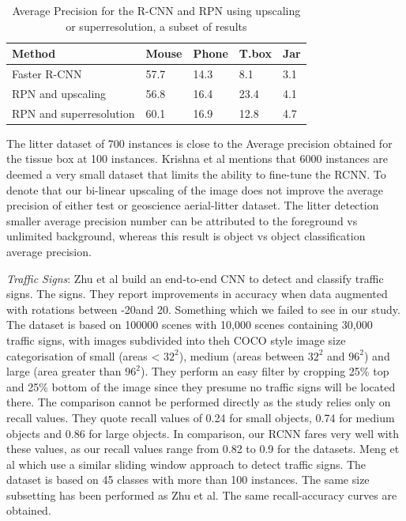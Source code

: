 \documentclass{IEEEtran}
\begin{document}
\begin{table}[h]
\caption{Average Precision for the R-CNN and RPN using upscaling or superresolution, a subset of results}
\centering
\begin{tabular}{lllll}
\hline
\textbf{Method}                         & \textbf{Mouse}            & \textbf{Phone}            & \textbf{T.box}            & \textbf{Jar}             \\ \hline
\multicolumn{1}{|l|}{Faster R-CNN}      & \multicolumn{1}{l|}{57.7} & \multicolumn{1}{l|}{14.3} & \multicolumn{1}{l|}{8.1}  & \multicolumn{1}{l|}{3.1} \\ \hline
\multicolumn{1}{|l|}{RPN and upscaling} & \multicolumn{1}{l|}{56.8} & \multicolumn{1}{l|}{16.4} & \multicolumn{1}{l|}{23.4} & \multicolumn{1}{l|}{4.1} \\ \hline
RPN and superresolution                 & 60.1                      & 16.9                      & 12.8                      & 4.7                      \\ \hline
\end{tabular}
\end{table}

The litter dataset of 700 instances is close to the Average precision obtained for the tissue box at 100 instances. Krishna et al \cite{Krishna} mentions that 6000 instances are deemed a very small dataset that limits the ability to fine-tune the RCNN. To denote that our bi-linear upscaling of the image does not improve the average precision of either test or geoscience aerial-litter dataset. The litter detection smaller average precision number can be attributed to the foreground vs unlimited background, whereas this result is object vs object classification average precision.\newline

\textit{Traffic Signs}: Zhu et al \cite{Zhu2016} build an end-to-end CNN to detect and classify traffic signs. The signs. They report improvements in accuracy when data augmented with rotations between -20\degree and 20\degree. Something which we failed to see in our study. The dataset is based on 100000 scenes with 10,000 scenes containing 30,000 traffic signs, with images subdivided into theh COCO style image size categorisation of small (areas < $32^2$), medium (areas between $32^2$ and $96^2$) and large (area greater than $96^2$). They perform an easy filter by cropping 25\% top and 25\% bottom of the image since they presume no traffic signs will be located there. The comparison cannot be performed directly as the study relies only on recall values. They quote recall values of 0.24 for small objects, 0.74 for medium objects and 0.86 for large objects. In comparison, our RCNN fares very well with these values, as our recall values range from 0.82 to 0.9 for the datasets. Meng et al \cite{Meng2017} which use a similar sliding window approach to detect traffic signs. The dataset is based on 45 classes with more than 100 instances. The same size subsetting has been performed as Zhu et al\cite{Zhu2016}. The same recall-accuracy curves are obtained. \newline
\end{document}
